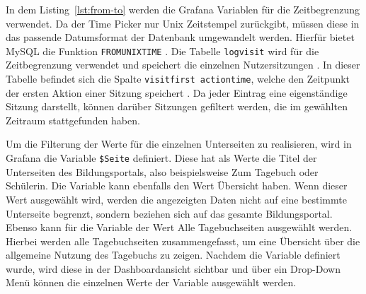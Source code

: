 \begin{figure}[H]
    \centering
    \begin{minipage}{\textwidth}
        
    \end{minipage}
\end{figure}

In dem Listing~\ref{lst:from-to} werden die Grafana Variablen für die Zeitbegrenzung verwendet. Da der Time Picker nur Unix Zeitstempel zurückgibt, müssen diese in das passende Datumsformat der Datenbank umgewandelt werden. Hierfür bietet MySQL die Funktion \texttt{FROM\textunderscore UNIXTIME} \parencite{MySQLUnixtime}. Die Tabelle \texttt{log\textunderscore visit} wird für die Zeitbegrenzung verwendet und speichert die einzelnen Nutzersitzungen \parencite{MatomoDBSchema}. In dieser Tabelle befindet sich die Spalte \texttt{visit\textunderscore first \textunderscore action\textunderscore time}, welche den Zeitpunkt der ersten Aktion einer Sitzung speichert \parencite{MatomoDBSchema}. Da jeder Eintrag eine eigenständige Sitzung darstellt, können darüber Sitzungen gefiltert werden, die im gewählten Zeitraum stattgefunden haben.

Um die Filterung der Werte für die einzelnen Unterseiten zu realisieren, wird in Grafana die Variable \texttt{\$Seite} definiert. Diese hat als Werte die Titel der Unterseiten des Bildungsportals, also beispielsweise \glqq Zum Tagebuch\grqq{} oder \glqq Schülerin\grqq{}. Die Variable kann ebenfalls den Wert \glqq Übersicht\grqq{} haben. Wenn dieser Wert ausgewählt wird, werden die angezeigten Daten nicht auf eine bestimmte Unterseite begrenzt, sondern beziehen sich auf das gesamte Bildungsportal. Ebenso kann für die Variable der Wert \glqq Alle Tagebuchseiten\grqq{} ausgewählt werden. Hierbei werden alle Tagebuchseiten zusammengefasst, um eine Übersicht über die allgemeine Nutzung des Tagebuchs zu zeigen. Nachdem die Variable definiert wurde, wird diese in der Dashboardansicht sichtbar und über ein Drop-Down Menü können die einzelnen Werte der Variable ausgewählt werden.

\begin{figure}[H]
    \centering
    \begin{minipage}{\textwidth}
        
    \end{minipage}
\end{figure}

